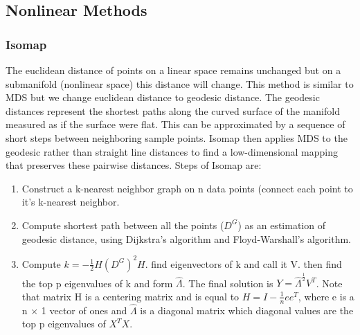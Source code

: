 \documentclass[a4paper]{article}
\begin{document}
\subsection{Nonlinear Methods}

\subsubsection{Isomap}
The euclidean distance of points on a linear space remains unchanged but on a submanifold (nonlinear space) this distance will change. This method is similar to MDS but we change euclidean distance to geodesic distance. The
geodesic distances represent the shortest paths along the curved surface of the manifold measured as if the surface were flat. This can be approximated by a sequence of short steps between neighboring sample points. Isomap then applies MDS to the geodesic rather than straight line distances to find a low-dimensional mapping that preserves these pairwise distances.
Steps of Isomap are:
\begin{enumerate}
\item Construct a k-nearest neighbor graph on n data points (connect each point to it's k-nearest neighbor.

\item Compute shortest path between all the points ($D^G$) as an estimation of geodesic distance, using Dijkstra's algorithm and Floyd-Warshall's algorithm.

\item Compute $k = -\frac{1}{2} H(D^G)^2 H$. find eigenvectors of k and call it V. then find the top p eigenvalues of k and form $\hat{\Lambda}$. The final solution is $Y = {\hat{\Lambda}}^\frac{1}{2} V^T$. Note that matrix H is a centering matrix and is equal to $H = I - \frac{1}{n}e e^T$, where e is a n $\times$ 1 vector of ones and $\hat{\Lambda}$ is a diagonal matrix which diagonal values are the top p eigenvalues of $X^T X$.

\end{enumerate}
\end{document}
